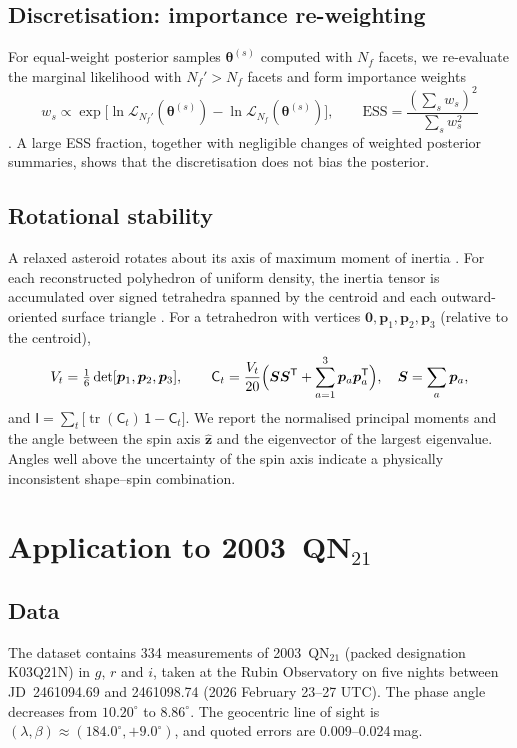 \documentclass[11pt,a4paper]{article}
\theoremstyle{remark}
\newcommand{\vect}[1]{\bm{#1}}
\newcommand{\uv}[1]{\hat{\bm{#1}}}
\newcommand{\T}{^{\mathsf T}}
\DeclareMathOperator{\tr}{tr}
\begin{document}
\subsection{Discretisation: importance re-weighting}
\label{sec:resolution}
For equal-weight posterior samples $\vect\theta^{(s)}$ computed with $N_f$ facets, we re-evaluate the
marginal likelihood with $N_f'>N_f$ facets and form importance weights
\begin{equation}
  w_s\propto\exp\bigl[\ln\mathcal L_{N_f'}(\vect\theta^{(s)})-\ln\mathcal L_{N_f}(\vect\theta^{(s)})\bigr],\qquad
  \mathrm{ESS}=\frac{(\sum_sw_s)^2}{\sum_sw_s^2}
\end{equation}
\citep{kish1965}. A large ESS fraction, together with negligible changes of weighted posterior
summaries, shows that the discretisation does not bias the posterior.

\subsection{Rotational stability}
\label{sec:stability}
A relaxed asteroid rotates about its axis of maximum moment of inertia \citep{burns1973}. For each
reconstructed polyhedron of uniform density, the inertia tensor is accumulated over signed tetrahedra
spanned by the centroid and each outward-oriented surface triangle
\citep[e.g.][]{mirtich1996}. For a tetrahedron with vertices
$\vect 0,\vect p_1,\vect p_2,\vect p_3$ (relative to the centroid),
\begin{equation}
  V_t=\tfrac16\det[\vect p_1,\vect p_2,\vect p_3],\qquad
  \mathsf C_t=\frac{V_t}{20}\Bigl(\vect S\vect S\T+\sum_{a=1}^3\vect p_a\vect p_a\T\Bigr),\quad \vect S=\sum_a\vect p_a,
\end{equation}
and $\mathsf I=\sum_t\bigl[\tr(\mathsf C_t)\,\mathsf 1-\mathsf C_t\bigr]$. We report the normalised
principal moments and the angle between the spin axis $\uv z$ and the eigenvector of the largest
eigenvalue. Angles well above the uncertainty of the spin axis indicate a physically inconsistent
shape--spin combination.

\section{Application to 2003~QN$_{21}$}
\label{sec:application}

\subsection{Data}
The dataset contains 334 measurements of 2003~QN$_{21}$ (packed designation K03Q21N) in $g$, $r$ and
$i$, taken at the Rubin Observatory on five nights between JD~2461094.69 and 2461098.74
(2026 February 23--27 UTC). The phase angle decreases from $10.20^\circ$ to $8.86^\circ$. The
geocentric line of sight is $(\lambda,\beta)\approx(184.0^\circ,+9.0^\circ)$, and quoted errors are
0.009--0.024\,mag.
\end{document}
